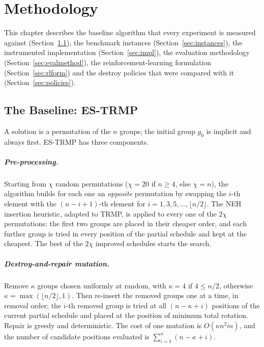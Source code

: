 
\chapter{Methodology} %

\label{Chapter3} %


This chapter describes the baseline algorithm that every experiment is measured against (Section~\ref{sec:es-trmp}), the benchmark instances (Section~\ref{sec:instances}), the instrumented implementation (Section~\ref{sec:impl}), the evaluation methodology (Section~\ref{sec:evalmethod}), the reinforcement-learning formulation (Section~\ref{sec:rlform}) and the destroy policies that were compared with it (Section~\ref{sec:policies}).


\section{The Baseline: ES-TRMP}\label{sec:es-trmp}

A solution is a permutation of the $n$ groups; the initial group $g_0$ is implicit and always first. ES-TRMP \cite{srivastava2018} has three components.

\paragraph{Pre-processing.} Starting from $\chi$ random permutations ($\chi=20$ if $n\ge4$, else $\chi=n$), the algorithm builds for each one an \emph{opposite} permutation by swapping the $i$-th element with the $(n-i+1)$-th element for $i=1,3,5,\ldots,\lfloor n/2\rfloor$. The NEH insertion heuristic, adapted to TRMP, is applied to every one of the $2\chi$ permutations: the first two groups are placed in their cheaper order, and each further group is tried in every position of the partial schedule and kept at the cheapest. The best of the $2\chi$ improved schedules starts the search.

\paragraph{Destroy-and-repair mutation.} Remove $\kappa$ groups chosen uniformly at random, with $\kappa=4$ if $4\le n/2$, otherwise $\kappa=\max(\lfloor n/2\rfloor,1)$. Then re-insert the removed groups one at a time, in removal order; the $i$-th removed group is tried at all $(n-\kappa+i)$ positions of the current partial schedule and placed at the position of minimum total rotation. Repair is greedy and deterministic. The cost of one mutation is $O(\kappa n^2 m)$, and the number of candidate positions evaluated is $\sum_{i=1}^{\kappa}(n-\kappa+i)$.

